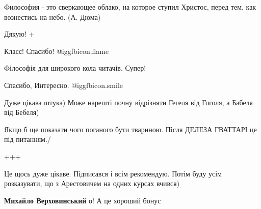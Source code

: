  
 
 
 
 
\zzSecCmt

\begin{itemize} %

Философия - это сверкающее облако, на которое ступил Христос, перед тем, как вознестись на небо.
(А. Дюма)

Дякую!
+

Класс! Спасибо!  @igg{fbicon.flame} 

Філософія для широкого кола читачів. Супер!

Спасибо, Интересно.  @igg{fbicon.smile} 

Дуже цікава штука) Може нарешті почну відрізняти Гегеля від Гоголя, а Бабеля від Бебеля)

Якщо б ще показати чого поганого бути твариною. Після ДЕЛЕЗА ГВАТТАРІ це під питанням./

+++

Це щось дуже цікаве. Підписався і всім рекомендую. Потім буду усім розказувати, що з Арестовичем на одних курсах вчився)

\textbf{Михайло Верховинський} о! А це хороший бонус

\end{itemize} %
